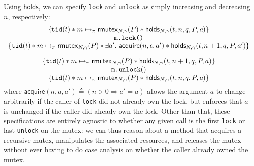Using $\mathsf{holds}$, we can specify \lstinline{lock} and \lstinline{unlock} as simply increasing and decreasing $n$, respectively:
\[\begin{array}{c}
\{\currentthread{t} \ast m \mapsto_\pi \rmutex{N, \gamma}{P}\ast\acquirable{N, \gamma}{t}{n}{q}{P}{a}\}\\ {\texttt{m.lock()}} \\ \{\currentthread{t} \ast m \mapsto_\pi \rmutex{N, \gamma}{P}\ast \exists a'.\ \mathsf{acquire}(n, a, a') \ast \acquirable{N, \gamma}{t}{n+1}{q}{P}{a'}\}  \vspace{1em}\\
    \{\currentthread{t} \ast m \mapsto_\pi \rmutex{N, \gamma}{P}\ast\acquirable{N, \gamma}{t}{n+1}{q}{P}{a}\}\\ {\texttt{m.unlock}()}\\
    \{\currentthread{t} \ast m \mapsto_\pi \rmutex{N, \gamma}{P}\ast\acquirable{N, \gamma}{t}{n}{q}{P}{a}\}
\end{array}\]
where $\mathsf{acquire}(n, a, a') \triangleq (n > 0 \Rightarrow a' = a)$ allows the argument $a$ to change arbitrarily if the caller of \lstinline{lock} did not already own the lock, but enforces that $a$ is unchanged if the caller did already own the lock. Other than that, these specifications are entirely agnostic to whether any given call is the first \lstinline{lock} or last \lstinline{unlock} on the mutex: we can thus reason about a method that acquires a recursive mutex, manipulates the associated resources, and releases the mutex without ever having to do case analysis on whether the caller already owned the mutex.


